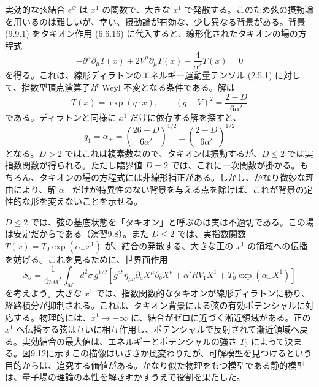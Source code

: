 実効的な弦結合 $e^\Phi$ は $x^1$ の関数で、大きな $x^1$ で発散する。このため弦の摂動論を用いるのは難しいが、幸い、摂動論が有効な、少し異なる背景がある。背景 (9.9.1) をタキオン作用 (6.6.16) に代入すると、線形化されたタキオンの場の方程式
\begin{equation}
-\partial^\mu\partial_\mu T(x)
+2V^\mu\partial_\mu T(x)-\frac4{\alpha'}T(x)=0
\tag{9.9.2}\label{eq:9.9.2}
\end{equation}
を得る。これは、線形ディラトンのエネルギー運動量テンソル (2.5.1) に対して、指数型頂点演算子が Weyl 不変となる条件である。解は
\begin{equation}
T(x)=\exp(q\cdot x),\qquad
(q-V)^2=\frac{2-D}{6\alpha'}
\tag{9.9.3}\label{eq:9.9.3}
\end{equation}
である。ディラトンと同様に $x^1$ だけに依存する解を探すと、
\begin{equation}
q_1=\alpha_\pm
=\left(\frac{26-D}{6\alpha'}\right)^{1/2}
\pm\left(\frac{2-D}{6\alpha'}\right)^{1/2}
\tag{9.9.4}\label{eq:9.9.4}
\end{equation}
となる。$D>2$ ではこれは複素数なので、タキオンは振動するが、$D\leq2$ では実指数関数が得られる。ただし臨界値 $D=2$ では、これに一次関数が掛かる。もちろん、タキオンの場の方程式には非線形補正がある。しかし、かなり微妙な理由により、解 $\alpha_-$ だけが特異性のない背景を与える点を除けば、これが背景の定性的な形を変えないことを示せる。

$D\leq2$ では、弦の基底状態を「タキオン」と呼ぶのは実は不適切である。この場は安定だからである（演習9.8）。また $D\leq2$ では、実指数関数 $T(x)=T_0\exp(\alpha_-x^1)$ が、結合の発散する、大きな正の $x^1$ の領域への伝播を妨げる。これを見るために、世界面作用
\begin{equation}
S_\sigma=\frac1{4\pi\alpha'}\int_M d^2\sigma\,g^{1/2}
\left[g^{ab}\eta_{\mu\nu}\partial_aX^\mu\partial_bX^\nu
+\alpha'RV_1X^1+T_0\exp(\alpha_-X^1)\right]
\tag{9.9.5}\label{eq:9.9.5}
\end{equation}
を考えよう。大きな $x^1$ では、指数関数的なタキオンが線形ディラトンに勝り、経路積分が抑制される。これは、タキオン背景による弦の有効ポテンシャルに対応する。物理的には、$x^1\to-\infty$ に、結合がゼロに近づく漸近領域がある。正の $x^1$ へ伝播する弦は互いに相互作用し、ポテンシャルで反射されて漸近領域へ戻る。実効結合の最大値は、エネルギーとポテンシャルの強さ $T_0$ によって決まる。図9.12に示すこの描像はいささか風変わりだが、可解模型を見つけるという目的からは、追究する価値がある。かなり似た物理をもつ模型である静的模型は、量子場の理論の本性を解き明かすうえで役割を果たした。

